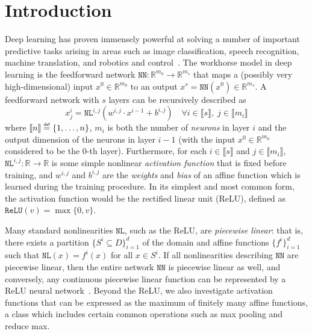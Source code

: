 \documentclass[smallextended]{svjour3}
\newcommand{\blue}[1]{{#1}}
\newcommand{\bbR}{\mathbb{R}}
\newcommand\defeq{\mathrel{\overset{\makebox[0pt]{\mbox{\normalfont\tiny\sffamily def}}}{=}}}
\newcommand{\NL}{\texttt{NL}}
\newcommand{\NN}{\texttt{NN}}
\newcommand{\ReLu}{\texttt{ReLU}}
\begin{document}
\section{Introduction}

Deep learning has proven immensely powerful at solving a number of important predictive tasks arising in areas such as image classification, speech recognition, machine translation, and robotics and control~\cite{Goodfellow:2016,LeCun:2015}. The workhorse model in deep learning is the feedforward network \blue{$\NN{}:\bbR^{m_0} \to \bbR^{m_s}$ that maps a (possibly very high-dimensional) input $x^0 \in \bbR^{m_0}$ to an output $x^s = \NN{}(x^0)\in \bbR^{m_s}$. A feedforward network with $s$ layers can be recursively described as }
\begin{equation} \label{eqn:simple-feedforward-network}
    x^i_j = \texttt{NL}^{i,j}(w^{i,j} \cdot x^{i-1} + b^{i,j}) \quad \blue{ \forall i \in \llbracket s \rrbracket,\; j \in \llbracket m_i \rrbracket}
\end{equation}
\blue{where $\llbracket n \rrbracket \defeq \{1,\ldots,n\}$, $m_i$ is both the number of \emph{neurons} in layer $i$ and the output dimension of the neurons in layer $i-1$ (with the input $x^0 \in \bbR^{m_0}$ considered to be the $0$-th layer). Furthermore, for each $i \in \llbracket s \rrbracket$ and $j \in \llbracket m_i \rrbracket$,  $\texttt{NL}^{i,j}:\bbR \to \bbR$ is some simple nonlinear \emph{activation function} that is fixed before training}, and $w^{i,j}$ and $b^{i,j}$ are the \emph{weights} and \emph{bias} of an affine function which is learned during the training procedure. In its simplest and most common form, the \blue{activation function} would be the rectified linear unit (ReLU), defined as $\ReLu{}(v) = \max\{0,v\}$. 

Many standard nonlinearities $\NL{}$, such as the ReLU, are \emph{piecewise linear}: that is, there exists a partition $\{S^i \subseteq D\}_{i=1}^d$ of the domain and affine functions $\{f^i\}_{i=1}^d$ such that $\NL{}(x) = f^i(x)$ for all $x \in S^i$.
If all nonlinearities describing $\NN{}$ are piecewise linear, then the entire network $\NN{}$ is piecewise linear as well, \blue{and conversely, any continuous piecewise linear function can be represented by a ReLU neural network~\cite{arora2016understanding}}. \blue{Beyond the ReLU, we also investigate activation functions that can be expressed as the maximum of finitely many affine functions, a class which includes certain common operations such as max pooling and reduce max.}
\end{document}
